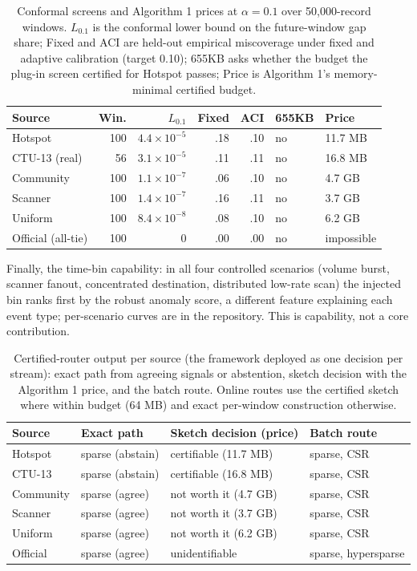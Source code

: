 \documentclass[conference]{IEEEtran}
\begin{document}
\begin{table}[t]
\centering
\caption{Conformal screens and Algorithm 1 prices at $\alpha=0.1$ over 50{,}000-record windows. $L_{0.1}$ is the conformal lower bound on the future-window gap share; Fixed and ACI are held-out empirical miscoverage under fixed and adaptive calibration (target 0.10); 655KB asks whether the budget the plug-in screen certified for Hotspot passes; Price is Algorithm 1's memory-minimal certified budget.}
\label{tab:conformal}
\scriptsize
\setlength{\tabcolsep}{2pt}
\begin{tabular}{lrrrrll}
\toprule
Source & Win. & $L_{0.1}$ & Fixed & ACI & 655KB & Price \\
\midrule
Hotspot & 100 & $4.4\times10^{-5}$ & .18 & .10 & no & 11.7 MB \\
CTU-13 (real) & 56 & $3.1\times10^{-5}$ & .11 & .11 & no & 16.8 MB \\
Community & 100 & $1.1\times10^{-7}$ & .06 & .10 & no & 4.7 GB \\
Scanner & 100 & $1.4\times10^{-7}$ & .16 & .11 & no & 3.7 GB \\
Uniform & 100 & $8.4\times10^{-8}$ & .08 & .10 & no & 6.2 GB \\
Official (all-tie) & 100 & $0$ & .00 & .00 & no & impossible \\
\bottomrule
\end{tabular}
\end{table}

Finally, the time-bin capability: in all four controlled scenarios (volume burst, scanner fanout, concentrated destination, distributed low-rate scan) the injected bin ranks first by the robust anomaly score, a different feature explaining each event type; per-scenario curves are in the repository. This is capability, not a core contribution.

\begin{table}[t]
\centering
\caption{Certified-router output per source (the framework deployed as one decision per stream): exact path from agreeing signals or abstention, sketch decision with the Algorithm 1 price, and the batch route. Online routes use the certified sketch where within budget (64 MB) and exact per-window construction otherwise.}
\label{tab:router}
\scriptsize
\setlength{\tabcolsep}{2pt}
\begin{tabular}{llll}
\toprule
Source & Exact path & Sketch decision (price) & Batch route \\
\midrule
Hotspot & sparse (abstain) & certifiable (11.7 MB) & sparse, CSR \\
CTU-13 & sparse (abstain) & certifiable (16.8 MB) & sparse, CSR \\
Community & sparse (agree) & not worth it (4.7 GB) & sparse, CSR \\
Scanner & sparse (agree) & not worth it (3.7 GB) & sparse, CSR \\
Uniform & sparse (agree) & not worth it (6.2 GB) & sparse, CSR \\
Official & sparse (agree) & unidentifiable & sparse, hypersparse \\
\bottomrule
\end{tabular}
\end{table}
\end{document}
